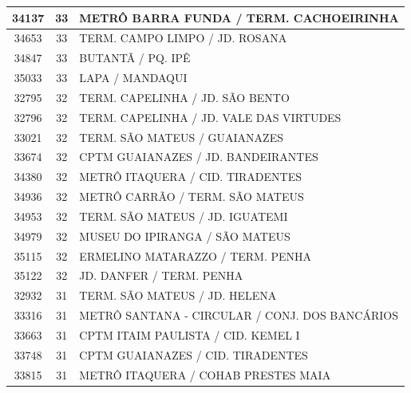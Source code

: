 \documentclass[
	12pt,				%
	oneside,			%
	a4paper,			%
	english,			%
	brazil				%
	]{abntex2ppgsi}
\begin{document}
\begin{apendicesenv}
\begin{longtable}{c|c|p{7cm}}
    34137 & 33    & METRÔ BARRA FUNDA / TERM. CACHOEIRINHA \\
\hline

    34653 & 33    & TERM. CAMPO LIMPO / JD. ROSANA \\
\hline

    34847 & 33    & BUTANTÃ / PQ. IPÊ \\
\hline

    35033 & 33    & LAPA / MANDAQUI \\
\hline

    32795 & 32    & TERM. CAPELINHA / JD. SÃO BENTO \\
\hline

    32796 & 32    & TERM. CAPELINHA / JD. VALE DAS VIRTUDES \\
\hline

    33021 & 32    & TERM. SÃO MATEUS / GUAIANAZES \\
\hline

    33674 & 32    & CPTM GUAIANAZES / JD. BANDEIRANTES \\
\hline

    34380 & 32    & METRÔ ITAQUERA / CID. TIRADENTES \\
\hline

    34936 & 32    & METRÔ CARRÃO / TERM. SÃO MATEUS \\
\hline

    34953 & 32    & TERM. SÃO MATEUS / JD. IGUATEMI \\
\hline

    34979 & 32    & MUSEU DO IPIRANGA / SÃO MATEUS \\
\hline

    35115 & 32    & ERMELINO MATARAZZO / TERM. PENHA \\
\hline

    35122 & 32    & JD. DANFER / TERM. PENHA     \\
\hline

    32932 & 31    & TERM. SÃO MATEUS / JD. HELENA \\
\hline

    33316 & 31    & METRÔ SANTANA - CIRCULAR / CONJ. DOS BANCÁRIOS \\
\hline

    33663 & 31    & CPTM ITAIM PAULISTA / CID. KEMEL I \\
\hline

    33748 & 31    & CPTM GUAIANAZES / CID. TIRADENTES \\
\hline

    33815 & 31    & METRÔ ITAQUERA / COHAB PRESTES MAIA \\
\hline


\end{longtable}
\end{apendicesenv}
\end{document}

